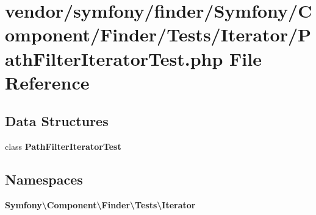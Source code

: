 \section{vendor/symfony/finder/\+Symfony/\+Component/\+Finder/\+Tests/\+Iterator/\+Path\+Filter\+Iterator\+Test.php File Reference}
\label{_path_filter_iterator_test_8php}
\subsection*{Data Structures}
\begin{DoxyCompactItemize}
\item 
class {\bf Path\+Filter\+Iterator\+Test}
\end{DoxyCompactItemize}
\subsection*{Namespaces}
\begin{DoxyCompactItemize}
\item 
 {\bf Symfony\textbackslash{}\+Component\textbackslash{}\+Finder\textbackslash{}\+Tests\textbackslash{}\+Iterator}
\end{DoxyCompactItemize}
